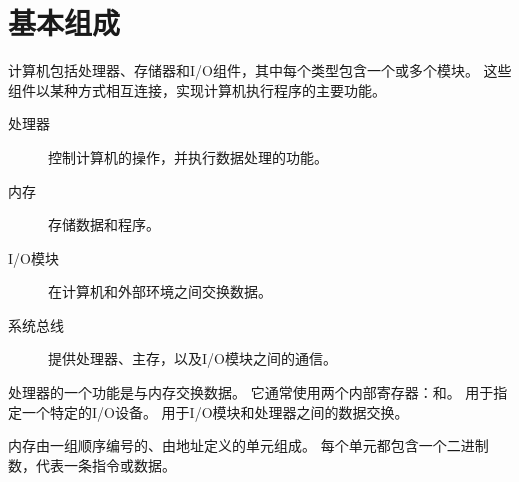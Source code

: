 
\section{基本组成}
{
    计算机包括处理器、存储器和I/O组件，其中每个类型包含一个或多个模块。
    这些组件以某种方式相互连接，实现计算机执行程序的主要功能。

    \begin{description}
        \item[处理器] 控制计算机的操作，并执行数据处理的功能。
        \item[内存] 存储数据和程序。
        \item[I/O模块] 在计算机和外部环境之间交换数据。
        \item[系统总线] 提供处理器、主存，以及I/O模块之间的通信。
    \end{description}

    处理器的一个功能是与内存交换数据。
    它通常使用两个内部寄存器：和。
    用于指定一个特定的I/O设备。
    用于I/O模块和处理器之间的数据交换。

    内存由一组顺序编号的、由地址定义的单元组成。
    每个单元都包含一个二进制数，代表一条指令或数据。
}
